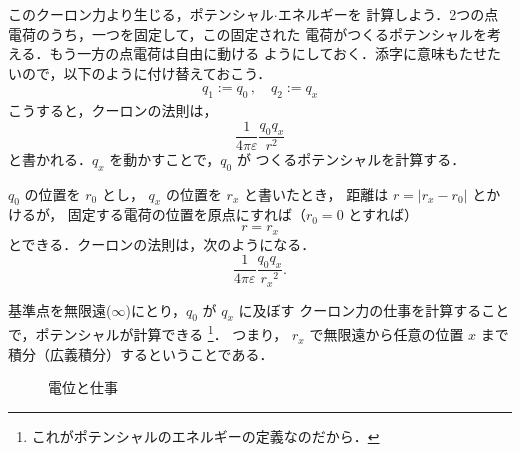             このクーロン力より生じる，ポテンシャル$\cdot$エネルギーを
            計算しよう．2つの点電荷のうち，一つを固定して，この固定された
            電荷がつくるポテンシャルを考える．もう一方の点電荷は自由に動ける
            ようにしておく．添字に意味もたせたいので，以下のように付け替えておこう．
                \begin{align*}
                    q_{1} := q_{0}\,, \quad q_{2} := q_{x}
                \end{align*}
            こうすると，クーロンの法則は，
                \begin{equation*}
                    \frac{1}{4 \pi \varepsilon}
                    \frac{q_{0}q_{x}}{{r}^{2}}
                \end{equation*}
            と書かれる．$q_{x}$ を動かすことで，$q_{0}$ が
            つくるポテンシャルを計算する．

            $q_{0}$ の位置を $r_{0}$ とし，
            $q_{x}$ の位置を $r_{x}$ と書いたとき，
            距離は $r = | r_{x} - r_{0} |$ とかけるが，
            固定する電荷の位置を原点にすれば（$r_{0}=0$ とすれば）
                \begin{equation*}
                    r = r_{x}
                \end{equation*}
            とできる．クーロンの法則は，次のようになる．
                \begin{equation*}
                    \frac{1}{4 \pi \varepsilon}
                    \frac{q_{0}q_{x}}{{r_{x}}^{2}}.
                \end{equation*}

            基準点を無限遠($\infty$)にとり，$q_{0}$ が $q_{x}$ に及ぼす
            クーロン力の仕事を計算することで，ポテンシャルが計算できる
                \footnote{
                    これがポテンシャルのエネルギーの定義なのだから．
                }．
            つまり，
            $r_{x}$ で無限遠から任意の位置 $x$ まで
            積分（広義積分）するということである．
                \begin{figure}[hbt]
                    \begin{center}
                        \caption{電位と仕事}
                        \label{fig:denni_Image}
                    \end{center}
                \end{figure}

